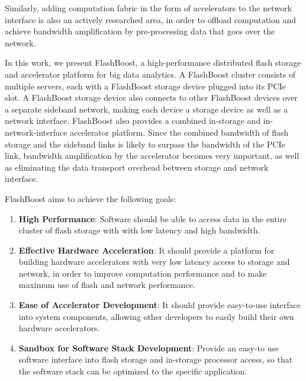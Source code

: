 Similarly, adding computation fabric in the form of accelerators to the network
interface is also an actively researched area, in order to offload computation
and achieve bandwidth amplification by pre-processing data that goes over the
network.

In this work, we present FlashBoost, a high-performance
distributed flash storage and accelerator platform for big data analytics.
A FlashBoost cluster consists of multiple servers, each with a FlashBoost
storage device plugged into its PCIe slot. A FlashBoost storage device also
connects to other FlashBoost devices over a separate sideband network, making
each device a storage device as well as a network interface.
FlashBoost also provides a combined in-storage and in-network-interface
accelerator platform. Since the combined bandwidth of flash storage and the
sideband links is likely to surpass the bandwidth of the PCIe link, bandwidth
amplification by the accelerator becomes very important, as well as eliminating
the data transport overhead between storage and network interface. 



FlashBoost aims to achieve the following goals:
\begin{enumerate}
\item \textbf{High Performance}: Software should be able to access
data in the entire cluster of flash storage with with low latency and high bandwidth.
\item \textbf{Effective Hardware Acceleration}: It should provide a platform for
building hardware accelerators with very low latency access to storage and
network, in order to improve computation performance and to make maximum use of
flash and network performance.
\item \textbf{Ease of Accelerator Development}: It should provide easy-to-use
interface into system components, allowing other developers to easily
build their own hardware accelerators.
\item \textbf{Sandbox for Software Stack Development}: Provide an easy-to use
software interface into flash storage and in-storage processor access, so that the software stack
can be optimized to the specific application.
\end{enumerate}

